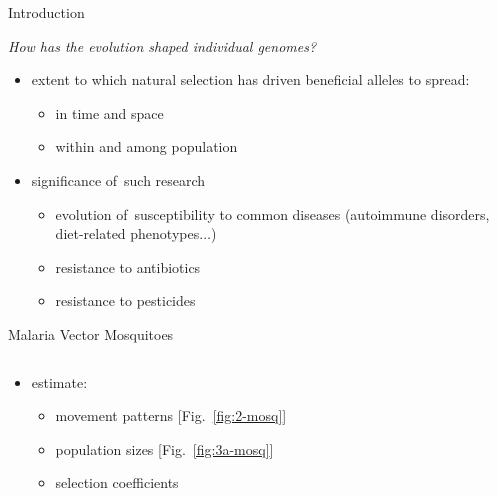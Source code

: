 \documentclass[final,hyperref={pdfpagelabels=false}]{beamer}
\begin{document}
\begin{frame}[t]
\begin{columns}[t]
\begin{column}{.465\textwidth}
            
\begin{block}{Introduction}

\emph{How has the evolution shaped individual genomes?}

\begin{itemize}
\item extent to which natural selection has driven beneficial alleles to spread:
    \begin{itemize}
    \item in time and space
    \item within and among population
    \end{itemize}
\end{itemize}

\begin{itemize}
    \item significance of~such research
    \begin{itemize}
    	\item evolution of~susceptibility to common diseases (autoimmune disorders, diet-related phenotypes$\dots$)
    	\item resistance to antibiotics
    	\item resistance to pesticides
    \end{itemize}
\end{itemize}
\end{block}


\begin{block}{Malaria Vector Mosquitoes}

\begin{columns} %
\begin{column}{.5\textwidth} %
\begin{itemize}
    \item estimate:
    \begin{itemize}
        \item movement patterns [Fig.~\ref{fig:2-mosq}]
        \item population sizes [Fig.~\ref{fig:3a-mosq}]
        \item selection coefficients
    \end{itemize}
\end{itemize}


\end{column}
\end{columns}
\end{block}
\end{column}
\end{columns}
\end{frame}
\end{document}

